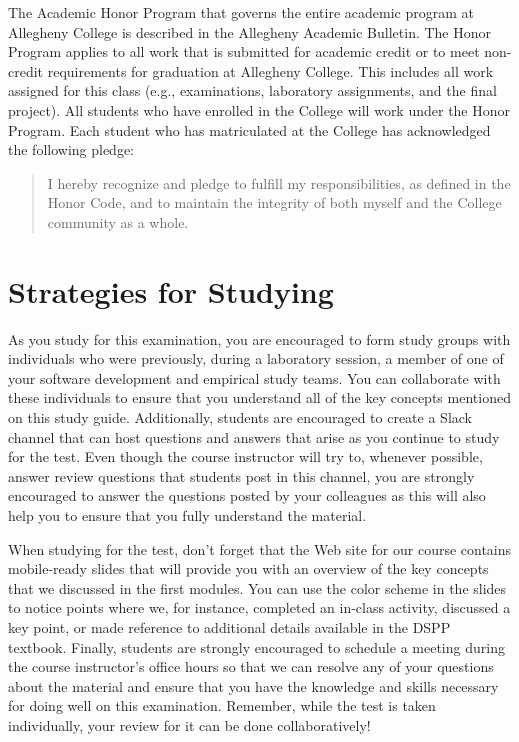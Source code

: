 The Academic Honor Program that governs the entire academic program at Allegheny College is described in the Allegheny
Academic Bulletin.  The Honor Program applies to all work that is submitted for academic credit or to meet non-credit
requirements for graduation at Allegheny College.  This includes all work assigned for this class (e.g., examinations,
laboratory assignments, and the final project).  All students who have enrolled in the College will work under the Honor
Program.  Each student who has matriculated at the College has acknowledged the following pledge:

\vspace*{-.11in}
\begin{quote}
  I hereby recognize and pledge to fulfill my responsibilities, as defined in the Honor Code, and to maintain the
  integrity of both myself and the College community as a whole.
\end{quote}
\vspace*{-.11in}

\vspace*{-.2in}
\section*{Strategies for Studying}
\vspace*{-.1in}

As you study for this examination, you are encouraged to form study groups with individuals who were previously, during
a laboratory session, a member of one of your software development and empirical study teams. You can collaborate with
these individuals to ensure that you understand all of the key concepts mentioned on this study guide. Additionally,
students are encouraged to create a Slack channel that can host questions and answers that arise as you continue to
study for the test.  Even though the course instructor will try to, whenever possible, answer review questions that
students post in this channel, you are strongly encouraged to answer the questions posted by your colleagues as this
will also help you to ensure that you fully understand the material.

When studying for the test, don't forget that the Web site for our course contains mobile-ready slides that will provide
you with an overview of the key concepts that we discussed in the first modules. You can use the color scheme in the
slides to notice points where we, for instance, completed an in-class activity, discussed a key point, or made reference
to additional details available in the DSPP textbook. Finally, students are strongly encouraged to schedule a meeting
during the course instructor's office hours so that we can resolve any of your questions about the material and ensure
that you have the knowledge and skills necessary for doing well on this examination. Remember, while the test is taken
individually, your review for it can be done collaboratively!


